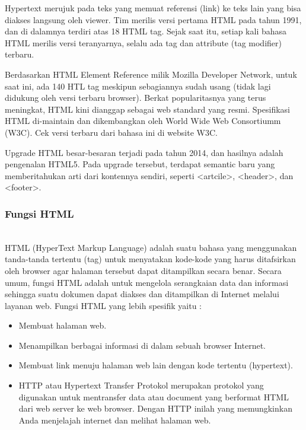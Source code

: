 Hypertext merujuk pada teks yang memuat referensi (link) ke teks lain yang bisa diakses langsung oleh viewer. Tim merilis versi pertama HTML pada tahun 1991, dan di dalamnya terdiri atas 18 HTML tag. Sejak saat itu, setiap kali bahasa HTML merilis versi teranyarnya, selalu ada tag dan attribute (tag modifier) terbaru.

Berdasarkan HTML Element Reference milik Mozilla Developer Network, untuk saat ini, ada 140 HTL tag meskipun sebagiannya sudah usang (tidak lagi didukung oleh versi terbaru browser).
Berkat popularitasnya yang terus meningkat, HTML kini dianggap sebagai web standard yang resmi. Spesifikasi HTML di-maintain dan dikembangkan oleh World Wide Web Consortiumm (W3C). Cek versi terbaru dari bahasa ini di website W3C.

Upgrade HTML besar-besaran terjadi pada tahun 2014, dan hasilnya adalah pengenalan HTML5. Pada upgrade tersebut, terdapat semantic baru yang memberitahukan arti dari kontennya sendiri, seperti <artcile>, <header>, dan <footer>.


\subsubsection{Fungsi HTML}
\hfill\\
HTML (HyperText Markup Language) adalah suatu bahasa yang menggunakan tanda-tanda tertentu (tag) untuk menyatakan kode-kode yang harus ditafsirkan oleh browser agar halaman tersebut dapat ditampilkan secara benar.
Secara umum, fungsi HTML adalah untuk mengelola serangkaian data dan informasi sehingga suatu dokumen dapat diakses dan ditampilkan di Internet melalui layanan web.
Fungsi HTML yang lebih spesifik yaitu :
\begin{itemize}
\item Membuat halaman web.
\item Menampilkan berbagai informasi di dalam sebuah browser Internet.
\item Membuat link menuju halaman web lain dengan kode tertentu (hypertext).
\item HTTP atau Hypertext Transfer Protokol merupakan protokol yang digunakan untuk mentransfer data atau document yang berformat HTML dari web server ke web browser. Dengan HTTP inilah yang memungkinkan Anda menjelajah internet dan melihat halaman web.
\end{itemize}


